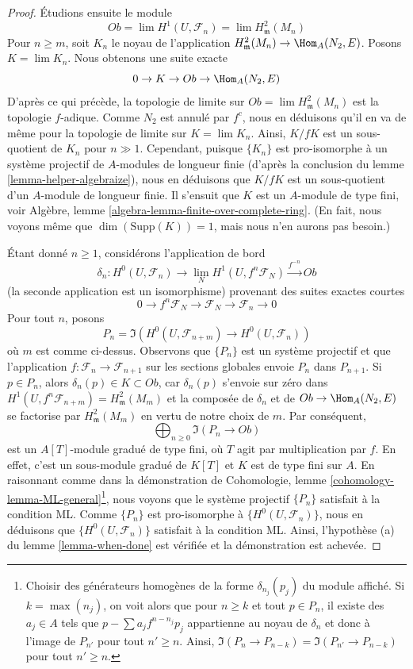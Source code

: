 \begin{proof}
\medskip\noindent
Étudions ensuite le module
$$
Ob = \lim H^1(U, \mathcal{F}_n) = \lim H^2_\mathfrak m(M_n)
$$
Pour $n \geq m$, soit $K_n$ le noyau de l'application
$H^2_\mathfrak m(M_n) \to \Hom_A(N_2, E)$.
Posons $K = \lim K_n$. Nous obtenons une suite exacte
$$
0 \to K \to Ob \to \Hom_A(N_2, E)
$$
D'après ce qui précède, la topologie de limite sur $Ob = \lim H^2_\mathfrak m(M_n)$
est la topologie $f$-adique. Comme $N_2$ est annulé par $f^c$,
nous en déduisons qu'il en va de même pour la topologie de limite sur $K = \lim K_n$.
Ainsi, $K/fK$ est un sous-quotient de $K_n$ pour $n \gg 1$.
Cependant, puisque $\{K_n\}$ est pro-isomorphe à un système projectif de
$A$-modules de longueur finie (d'après la conclusion du
lemme \ref{lemma-helper-algebraize}),
nous en déduisons que $K/fK$ est un sous-quotient d'un
$A$-module de longueur finie. Il s'ensuit que $K$ est un $A$-module de type fini, voir
Algèbre, lemme \ref{algebra-lemma-finite-over-complete-ring}.
(En fait, nous voyons même que $\dim(\text{Supp}(K)) = 1$, mais
nous n'en aurons pas besoin.)

\medskip\noindent
Étant donné $n \geq 1$, considérons l'application de bord
$$
\delta_n :
H^0(U, \mathcal{F}_n)
\longrightarrow
\lim_N H^1(U, f^n\mathcal{F}_N) \xrightarrow{f^{-n}} Ob
$$
(la seconde application est un isomorphisme)
provenant des suites exactes courtes
$$
0 \to f^n\mathcal{F}_N \to \mathcal{F}_N \to \mathcal{F}_n \to 0
$$
Pour tout $n$, posons
$$
P_n = \Im(H^0(U, \mathcal{F}_{n + m}) \to H^0(U, \mathcal{F}_n))
$$
où $m$ est comme ci-dessus. Observons que $\{P_n\}$ est un système
projectif et que l'application $f : \mathcal{F}_n \to \mathcal{F}_{n + 1}$
sur les sections globales envoie $P_n$ dans $P_{n + 1}$.
Si $p \in P_n$, alors $\delta_n(p) \in K \subset Ob$,
car $\delta_n(p)$ s'envoie sur zéro dans
$H^1(U, f^n\mathcal{F}_{n + m}) = H^2_\mathfrak m(M_m)$
et la composée de $\delta_n$ et de $Ob \to \Hom_A(N_2, E)$
se factorise par $H^2_\mathfrak m(M_m)$ en vertu de notre choix de $m$.
Par conséquent,
$$
\bigoplus\nolimits_{n \geq 0} \Im(P_n \to Ob)
$$
est un $A[T]$-module gradué de type fini, où $T$ agit par multiplication par $f$.
En effet, c'est un sous-module gradué de $K[T]$ et $K$ est de type fini sur $A$.
En raisonnant comme dans la démonstration de
Cohomologie, lemme \ref{cohomology-lemma-ML-general}\footnote{Choisir
des générateurs homogènes de la forme $\delta_{n_j}(p_j)$ du module
affiché. Si $k = \max(n_j)$, on voit alors que pour $n \geq k$
et tout $p \in P_n$, il existe des $a_j \in A$ tels que
$p - \sum a_j f^{n - n_j} p_j$ appartienne au noyau de $\delta_n$
et donc à l'image de $P_{n'}$ pour tout $n' \geq n$.
Ainsi, $\Im(P_n \to P_{n - k}) = \Im(P_{n'} \to P_{n - k})$
pour tout $n' \geq n$.},
nous voyons que le système projectif $\{P_n\}$ satisfait à la condition ML.
Comme $\{P_n\}$ est pro-isomorphe à $\{H^0(U, \mathcal{F}_n)\}$,
nous en déduisons que $\{H^0(U, \mathcal{F}_n)\}$ satisfait à la condition ML.
Ainsi, l'hypothèse (a) du lemme \ref{lemma-when-done}
est vérifiée et la démonstration est achevée.
\end{proof}

